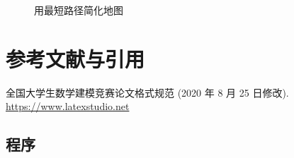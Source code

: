 \documentclass[withoutpreface,bwprint]{cumcmthesis} %
\begin{document}
\begin{figure}
\begin{minipage}[c]{0.45\textwidth}
        \label{jianhua}
    \end{minipage}
    \caption{用最短路径简化地图}
    \label{jianhuaguocheng}
\end{figure}



\section{参考文献与引用}

\begin{thebibliography}{9}%
    全国大学生数学建模竞赛论文格式规范 (2020 年 8 月 25 日修改).
     \url{https://www.latexstudio.net}
\end{thebibliography}

\newpage
\begin{appendices}

\section{程序}

\begin{lstlisting}[language=matlab]

\end{lstlisting}

\end{appendices}
\end{document}
